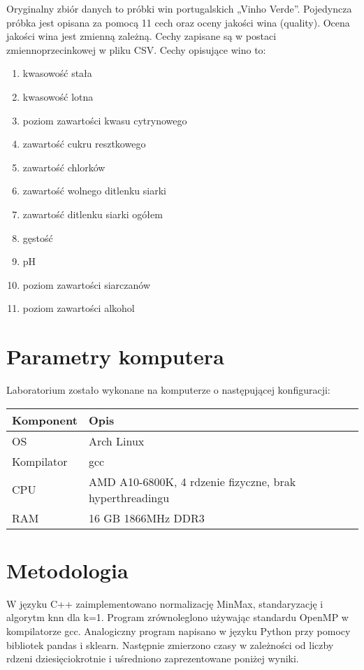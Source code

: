 \documentclass{scrartcl}
\begin{document}
Oryginalny zbiór danych to próbki win portugalskich „Vinho Verde”.
Pojedyncza próbka jest opisana za pomocą 11 cech oraz oceny jakości wina (quality). Ocena jakości wina jest zmienną zależną. Cechy zapisane są w postaci
zmiennoprzecinkowej w pliku CSV.
Cechy opisujące wino to:
\begin{enumerate}
\item kwasowość stała
\item kwasowość lotna
\item poziom zawartości kwasu cytrynowego
\item zawartość cukru resztkowego
\item zawartość chlorków
\item zawartość wolnego ditlenku siarki
\item zawartość ditlenku siarki ogółem
\item gęstość
\item pH
\item poziom zawartości siarczanów
\item poziom zawartości alkohol
\end{enumerate}

\section{Parametry komputera}
Laboratorium zostało wykonane na komputerze o następującej konfiguracji:
\begin{table}[h]
    \centering
    \begin{tabular}{llr}
\hline

\cline{1-2}
Komponent   & Opis  \\
\hline
OS      & Arch Linux    \\

Kompilator      & gcc    \\

CPU      & AMD A10-6800K, 4 rdzenie fizyczne, brak hyperthreadingu    \\
          
RAM       & 16 GB 1866MHz DDR3           \\

\hline
\end{tabular}
\end{table}

\section{Metodologia}
W języku C++ zaimplementowano normalizację MinMax, standaryzację i algorytm knn dla k=1. Program zrównoleglono używając standardu OpenMP w kompilatorze gcc. Analogiczny program napisano w języku Python przy pomocy bibliotek pandas i sklearn. Następnie zmierzono czasy w zależności od liczby rdzeni dziesięciokrotnie i uśredniono zaprezentowane poniżej wyniki.
\end{document}
